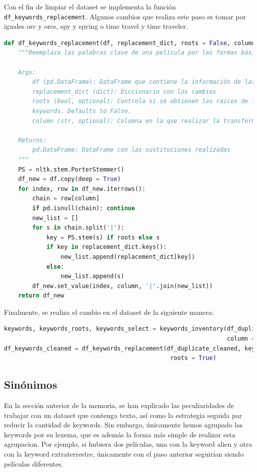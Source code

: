 Con el fin de limpiar el dataset se implementa la función \texttt{df\_keywords\_replacement}. Algunos cambios que realiza este paso es tomar por iguales orc y orcs, spy y spying o time travel y time traveler.
\begin{lstlisting}[language=Python, caption= Extracción del lexema de las keywords.]
def df_keywords_replacement(df, replacement_dict, roots = False, column = 'plot_keywords'):
    """Reemplaza las palabras clave de una película por las formas básicas de las mismas.

    Args:
        df (pd.DataFrame): DataFrame que contiene la información de las películas
        replacement_dict (dict): Diccionario con los cambios
        roots (bool, optional): Controla si se obtienen las raices de las palabras de las
        keywords. Defaults to False.
        column (str, optional): Columna en la que realizar la transformación. Defaults to 'plot_keywords'.

    Returns:
        pd.DataFrame: DataFrame con las sustituciones realizadas
    """
    PS = nltk.stem.PorterStemmer()
    df_new = df.copy(deep = True)
    for index, row in df_new.iterrows():
        chain = row[column]
        if pd.isnull(chain): continue
        new_list = []
        for s in chain.split('|'): 
            key = PS.stem(s) if roots else s
            if key in replacement_dict.keys():
                new_list.append(replacement_dict[key])
            else:
                new_list.append(s)       
        df_new.set_value(index, column, '|'.join(new_list)) 
    return df_new
\end{lstlisting}

Finalmente, se realiza el cambio en el dataset de la siguiente manera:

\begin{lstlisting}[language=Python, caption= Sustitucion de las keywords por su forma primitiva.]
keywords, keywords_roots, keywords_select = keywords_inventory(df_duplicate_cleaned,
                                                               column = 'plot_keywords')
df_keywords_cleaned = df_keywords_replacement(df_duplicate_cleaned, keywords_select,
                                               roots = True)
\end{lstlisting}

\subsection{Sinónimos}

En la sección anterior de la memoria, se han explicado las peculiaridades de trabajar con un dataset que contenga texto, así como la estrategia seguida par reducir la cantidad de keywords. Sin embargo, únicamente hemos agrupado las keywords por su lexema, que es además la forma más simple de realizar esta agrupacion. Por ejemplo, si hubiera dos películas, una con la keyword alien y otra con la keyword extraterrestre, únicamente con el paso anterior seguirían siendo películas diferentes.\\

